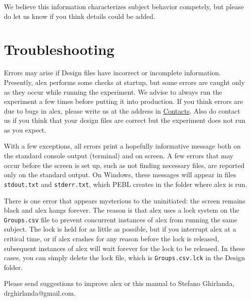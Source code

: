 \documentclass[11pt,]{article}
\begin{document}
We believe this information characterizes subject behavior competely,
but please do let us know if you think details could be added.

\section{Troubleshooting}\label{troubleshooting}

Errors may arise if Design files have incorrect or incomplete
information. Presently, alex performs some checks at startup, but some
errors are caught only as they occur while running the experiment. We
advise to always run the experiment a few times before putting it into
production. If you think errors are due to bugs in alex, please write us
at the address in \hyperref[contacts]{Contacts}. Also do contact us if
you think that your design files are correct but the experiment does not
run as you expect.

With a few exceptions, all errors print a hopefully informative message
both on the standard console output (terminal) and on screen. A few
errors that may occur before the screen is set up, such as not finding
necessary files, are reported only on the standard output. On Windows,
these messages will appear in files \texttt{stdout.txt} and
\texttt{stderr.txt}, which PEBL creates in the folder where alex is run.

There is one error that appears mysterious to the uninitiated: the
screen remains black and alex hangs forever. The reason is that alex
uses a lock system on the \texttt{Groups.csv} file to prevent concurrent
instances of alex from running the same subject. The lock is held for as
little as possible, but if you interrupt alex at a critical time, or if
alex crashes for any reason before the lock is released, subsequent
instances of alex will wait forever for the lock to be released. In
these cases, you can simply delete the lock file, which is
\texttt{Groups.csv.lck} in the Design folder.


Please send suggestions to improve alex or this manual to Stefano
Ghirlanda, drghirlanda@gmail.com.
\end{document}

